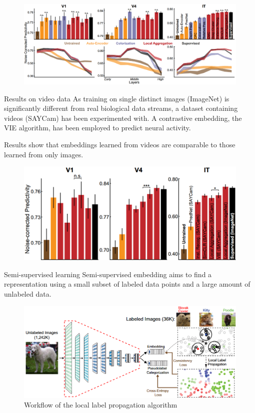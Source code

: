 \begin{casestudy}
\begin{descriptionlist}
            \begin{figure}[H]
                \centering
                \includegraphics[width=0.8\linewidth]{./img/unsupervised_embedding2.png}
            \end{figure}
        
        \item[Results on video data]
            As training on single distinct images (ImageNet) is significantly different from real biological data streams,
            a dataset containing videos (SAYCam) has been experimented with.
            A contrastive embedding, the VIE algorithm, has been employed to predict neural activity.

            Results show that embeddings learned from videos are comparable to those learned from only images.

            \begin{figure}[H]
                \centering
                \includegraphics[width=0.6\linewidth]{./img/unsupervised_embedding3.png}
            \end{figure}

        \item[Semi-supervised learning]
            Semi-supervised embedding aims to find a representation using a small subset of labeled data points and a large amount of unlabeled data.

            \begin{figure}[H]
                \centering
                \includegraphics[width=0.75\linewidth]{./img/local_label_propagation.png}
                \caption{Workflow of the local label propagation algorithm}
            \end{figure}


\end{descriptionlist}
\end{casestudy}

